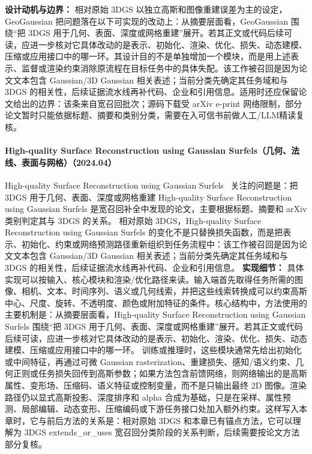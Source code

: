 \textbf{设计动机与边界：} 相对原始 3DGS 以独立高斯和图像重建误差为主的设定，GeoGaussian 把问题落在以下可实现的改动上：从摘要层面看，GeoGaussian 围绕“把 3DGS 用于几何、表面、深度或网格重建”展开。若其正文或代码后续可读，应进一步核对它具体改动的是表示、初始化、渲染、优化、损失、动态建模、压缩或应用接口中的哪一环。其设计目的不是单独增加一个模块，而是用上述表示、监督或渲染约束消除原流程在目标任务中的具体失配。该工作被召回是因为论文文本包含 Gaussian/3D Gaussian 相关表述；当前分类先确定其任务域和与 3DGS 的相关性，后续证据流水线再补代码、企业和引用信息。适用时还应保留论文给出的边界：该条来自宽召回批次；源码下载受 arXiv e-print 网络限制，部分论文暂时只能依据标题、摘要和类别分类，需要在入可信书前做人工/LLM精读复核。
\paragraph{High-quality Surface Reconstruction using Gaussian Surfels（几何、法线、表面与网格）（2024.04）}
High-quality Surface Reconstruction using Gaussian Surfels~\cite{2404_17774} 关注的问题是：把 3DGS 用于几何、表面、深度或网格重建 High-quality Surface Reconstruction using Gaussian Surfels 是宽召回补全中发现的论文，主要根据标题、摘要和 arXiv 类别判定其与 3DGS 的关系。
相对原始 3DGS，High-quality Surface Reconstruction using Gaussian Surfels 的变化不是只替换损失函数，而是把表示、初始化、约束或网络预测路径重新组织到任务流程中：该工作被召回是因为论文文本包含 Gaussian/3D Gaussian 相关表述；当前分类先确定其任务域和与 3DGS 的相关性，后续证据流水线再补代码、企业和引用信息。
\textbf{实现细节：} 具体实现可以按输入、核心模块和渲染/优化路径来读。输入端首先取得任务所需的图像、相机、文本、时间序列、语义或几何线索，并把这些线索转换成可以约束高斯中心、尺度、旋转、不透明度、颜色或附加特征的条件。核心结构中，方法使用的主要机制是：从摘要层面看，High-quality Surface Reconstruction using Gaussian Surfels 围绕“把 3DGS 用于几何、表面、深度或网格重建”展开。若其正文或代码后续可读，应进一步核对它具体改动的是表示、初始化、渲染、优化、损失、动态建模、压缩或应用接口中的哪一环。 训练或推理时，这些模块通常先给出初始化或中间特征，再通过可微 Gaussian rasterization、重建损失、感知/语义约束、几何正则或任务损失回传到高斯参数；如果方法包含前馈网络，则网络输出的是高斯属性、变形场、压缩码、语义特征或控制变量，而不是只输出最终 2D 图像。渲染路径仍以显式高斯投影、深度排序和 alpha 合成为基础，只是在采样、属性预测、局部编辑、动态变形、压缩编码或下游任务接口处加入额外约束。这样写入本章时，它与前后方法的关系是：相对原始 3DGS 和本章已有锚点方法，它可以理解为 3DGS extends\_or\_uses 宽召回分类阶段的关系判断，后续需要按论文方法部分复核。
